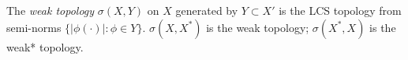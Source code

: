 The \emph{weak topology} $\sigma(X,Y)$ on $X$ generated by $Y\subset X'$ is the LCS topology from semi-norms $\{|\phi(\cdot)|:\phi\in Y\}$. $\sigma(X,X^*)$ is the weak topology; $\sigma(X^*,X)$ is the weak* topology.
